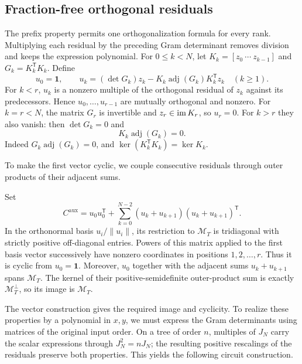\documentclass[11pt,letterpaper]{article}
\theoremstyle{definition}\newtheorem{definition}[theorem]{Definition}
\theoremstyle{remark}\newtheorem{remark}[theorem]{Remark}
\DeclareMathOperator{\adj}{adj}\DeclareMathOperator{\End}{End}
\newcommand{\one}{\mathbf1}\newcommand{\M}{\mathcal M}
\begin{document}
\subsection{Fraction-free orthogonal residuals}
The prefix property permits one orthogonalization formula for every rank.
Multiplying each residual by the preceding Gram determinant removes division
and keeps the expression polynomial.
For $0\le k<N$, let $K_k=[z_0\ \cdots\ z_{k-1}]$ and $G_k=K_k^{\mathsf T}K_k$. Define
\begin{equation}\label{eq:residual}
u_0=\one,\qquad
u_k=(\det G_k)z_k-K_k\adj(G_k)K_k^{\mathsf T}z_k\quad(k\ge1).
\end{equation}
For $k<r$, $u_k$ is a nonzero multiple of the orthogonal residual of $z_k$ against its predecessors. Hence $u_0,\ldots,u_{r-1}$ are mutually orthogonal and nonzero. For $k=r<N$, the matrix $G_r$ is invertible and $z_r\in\operatorname{im} K_r$, so $u_r=0$. For $k>r$ they also vanish: then $\det G_k=0$ and
\[
K_k\adj(G_k)=0.
\]
Indeed $G_k\adj(G_k)=0$, and $\ker(K_k^{\mathsf T}K_k)=\ker K_k$.

To make the first vector cyclic, we couple consecutive residuals through
outer products of their adjacent sums.

Set
\begin{equation}\label{eq:jacobi}
C^{\mathrm{aux}}=u_0u_0^{\mathsf T}
       +\sum_{k=0}^{N-2}(u_k+u_{k+1})(u_k+u_{k+1})^{\mathsf T}.
\end{equation}
In the orthonormal basis $u_i/\|u_i\|$, its restriction to $\M_T$ is tridiagonal with strictly positive off-diagonal entries. Powers of this matrix applied to the first basis vector successively have nonzero coordinates in positions $1,2,\ldots,r$. Thus it is cyclic from $u_0=\one$. Moreover, $u_0$ together with the adjacent sums $u_k+u_{k+1}$ spans $\M_T$. The kernel of their positive-semidefinite outer-product sum is exactly $\M_T^\perp$, so its image is $\M_T$.

The vector construction gives the required image and cyclicity. To realize
these properties by a polynomial in $x,y$, we must express the Gram
determinants using matrices of the original input order. On a tree of order $n$,
multiples of $J_N$ carry the scalar expressions through $J_N^2=nJ_N$; the resulting positive
rescalings of the residuals preserve both properties. This yields the
following circuit construction.
\end{document}
